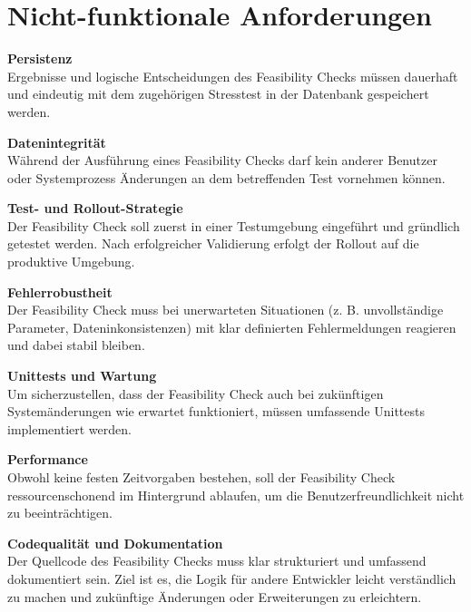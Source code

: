 \section{Nicht-funktionale Anforderungen}

\setlength{\leftskip}{1em} 
\textbf{Persistenz}  \\
Ergebnisse und logische Entscheidungen des Feasibility Checks müssen dauerhaft und eindeutig mit dem zugehörigen Stresstest in der Datenbank gespeichert werden.

\textbf{Datenintegrität}  \\
Während der Ausführung eines Feasibility Checks darf kein anderer Benutzer oder Systemprozess Änderungen an dem betreffenden Test vornehmen können.

\textbf{Test- und Rollout-Strategie}  \\
Der Feasibility Check soll zuerst in einer Testumgebung eingeführt und gründlich getestet werden. Nach erfolgreicher Validierung erfolgt der Rollout auf die produktive Umgebung.

\textbf{Fehlerrobustheit}  \\
Der Feasibility Check muss bei unerwarteten Situationen (z. B. unvollständige Parameter, Dateninkonsistenzen) mit klar definierten Fehlermeldungen reagieren und dabei stabil bleiben.

\textbf{Unittests und Wartung}  \\
Um sicherzustellen, dass der Feasibility Check auch bei zukünftigen Systemänderungen wie erwartet funktioniert, müssen umfassende Unittests implementiert werden.

\textbf{Performance}  \\
Obwohl keine festen Zeitvorgaben bestehen, soll der Feasibility Check ressourcenschonend im Hintergrund ablaufen, um die Benutzerfreundlichkeit nicht zu beeinträchtigen.

\textbf{Codequalität und Dokumentation}  \\
Der Quellcode des Feasibility Checks muss klar strukturiert und umfassend dokumentiert sein. Ziel ist es, die Logik für andere Entwickler leicht verständlich zu machen und zukünftige Änderungen oder Erweiterungen zu erleichtern.


\setlength{\leftskip}{0em} %